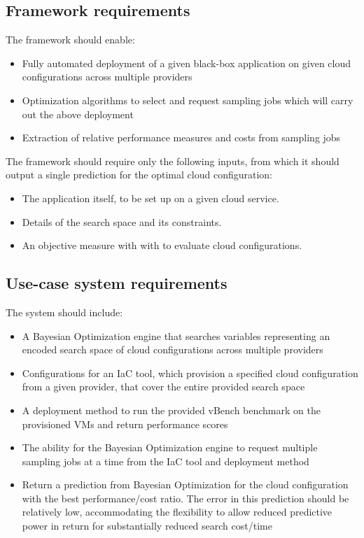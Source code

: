 \documentclass{report}
\begin{document}
\subsection{Framework requirements}
The framework should enable:
\begin{itemize}
\item Fully automated deployment of a given black-box application on given cloud configurations across multiple providers
\item Optimization algorithms to select and request sampling jobs which will carry out the above deployment
\item Extraction of relative performance measures and costs from sampling jobs
\end{itemize}
The framework should require only the following inputs, from which it should output a single prediction for the optimal cloud configuration:
\begin{itemize}
\item The application itself, to be set up on a given cloud service.
\item Details of the search space and its constraints.
\item An objective measure with with to evaluate cloud configurations.
\end{itemize}

\subsection{Use-case system requirements}
The system should include:
\begin{itemize}
\item A Bayesian Optimization engine that searches variables representing an encoded search space of cloud configurations across multiple providers
\item Configurations for an IaC tool, which provision a specified cloud configuration from a given provider, that cover the entire provided search space
\item A deployment method to run the provided vBench benchmark on the provisioned VMs and return performance scores
\item The ability for the Bayesian Optimization engine to request multiple sampling jobs at a time from the IaC tool and deployment method
\item Return a prediction from Bayesian Optimization for the cloud configuration with the best performance/cost ratio. The error in this prediction should be relatively low, accommodating the flexibility to allow reduced predictive power in return for substantially reduced search cost/time
\end{itemize}
\end{document}
